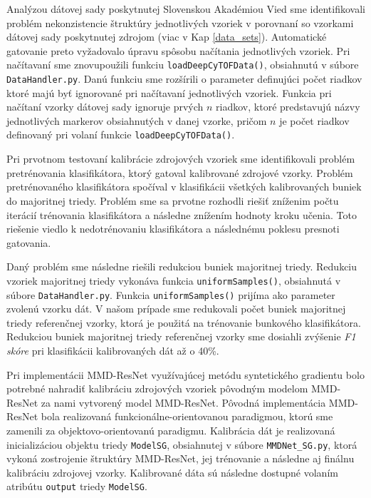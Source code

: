 Analýzou dátovej sady poskytnutej Slovenskou Akadémiou Vied sme identifikovali problém nekonzistencie štruktúry jednotlivých vzoriek v porovnaní so vzorkami dátovej sady poskytnutej zdrojom \cite{Li2017} (viac v Kap \ref{data_sets}). Automatické gatovanie preto vyžadovalo úpravu spôsobu načítania jednotlivých vzoriek. Pri načítavaní sme znovupoužili funkciu \texttt{loadDeepCyTOFData()}, obsiahnutú v súbore \texttt{DataHandler.py}. Danú funkciu sme rozšírili o parameter definujúci počet riadkov ktoré majú byť ignorované pri načítavaní jednotlivých vzoriek. Funkcia pri načítaní vzorky dátovej sady ignoruje prvých $n$ riadkov, ktoré predstavujú názvy jednotlivých markerov obsiahnutých v danej vzorke, pričom $n$ je počet riadkov definovaný pri volaní funkcie \texttt{loadDeepCyTOFData()}.

Pri prvotnom testovaní kalibrácie zdrojových vzoriek sme identifikovali problém pretrénovania klasifikátora, ktorý gatoval kalibrované zdrojové vzorky. Problém pretrénovaného klasifikátora spočíval v klasifikácii všetkých kalibrovaných buniek do majoritnej triedy. Problém sme sa prvotne rozhodli riešiť zníženim počtu iterácií trénovania klasifikátora a následne znížením hodnoty kroku učenia. Toto riešenie viedlo k nedotrénovaniu klasifikátora a následnému poklesu presnoti gatovania.

Daný problém sme následne riešili redukciou buniek majoritnej triedy. Redukciu vzoriek majoritnej triedy vykonáva funkcia \texttt{uniformSamples()}, obsiahnutá v súbore \texttt{DataHandler.py}. Funkcia \texttt{uniformSamples()} prijíma ako parameter zvolenú vzorku dát. V našom prípade sme redukovali počet buniek majoritnej triedy referenčnej vzorky, ktorá je použitá na trénovanie bunkového klasifikátora. Redukciou buniek majoritnej triedy referenčnej vzorky sme dosiahli zvýšenie \textit{F1 skóre} pri klasifikácii kalibrovaných dát až o 40\%.

Pri implementácii MMD-ResNet využívajúcej metódu syntetického gradientu bolo potrebné nahradiť kalibráciu zdrojových vzoriek pôvodným modelom MMD-ResNet za nami vytvorený model MMD-ResNet. Pôvodná implementácia MMD-ResNet bola realizovaná funkcionálne-orientovanou paradigmou, ktorú sme zamenili za objektovo-orientovanú paradigmu. Kalibrácia dát je realizovaná inicializáciou objektu triedy \texttt{ModelSG}, obsiahnutej v súbore \texttt{MMDNet_SG.py}, ktorá vykoná zostrojenie štruktúry MMD-ResNet, jej trénovanie a následne aj finálnu kalibráciu zdrojovej vzorky. Kalibrované dáta sú následne dostupné volaním atribútu \texttt{output} triedy \texttt{ModelSG}.


